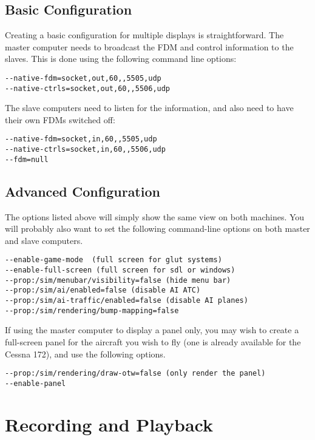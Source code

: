 \subsection{Basic Configuration}

Creating a basic configuration for multiple displays is straightforward. The
master computer needs to broadcast the FDM and control information to the slaves.
This is done using the following command line options:

\begin{verbatim}
--native-fdm=socket,out,60,,5505,udp
--native-ctrls=socket,out,60,,5506,udp
\end{verbatim}

The slave computers need to listen for the information, and also need to have
their own FDMs switched off:

\begin{verbatim}
--native-fdm=socket,in,60,,5505,udp
--native-ctrls=socket,in,60,,5506,udp
--fdm=null
\end{verbatim}

\subsection{Advanced Configuration}

The options listed above will simply show the same view on both machines. You will probably also want to set the
following command-line options on both master and slave computers.

\begin{verbatim}
--enable-game-mode  (full screen for glut systems)
--enable-full-screen (full screen for sdl or windows)
--prop:/sim/menubar/visibility=false (hide menu bar)
--prop:/sim/ai/enabled=false (disable AI ATC)
--prop:/sim/ai-traffic/enabled=false (disable AI planes)
--prop:/sim/rendering/bump-mapping=false
\end{verbatim}

If using the master computer to display a panel only, you may wish to create a full-screen panel for the
aircraft you wish to fly (one is already available for the Cessna 172), and use the following options.

\begin{verbatim}
--prop:/sim/rendering/draw-otw=false (only render the panel)
--enable-panel
\end{verbatim}

\section{Recording and Playback}

